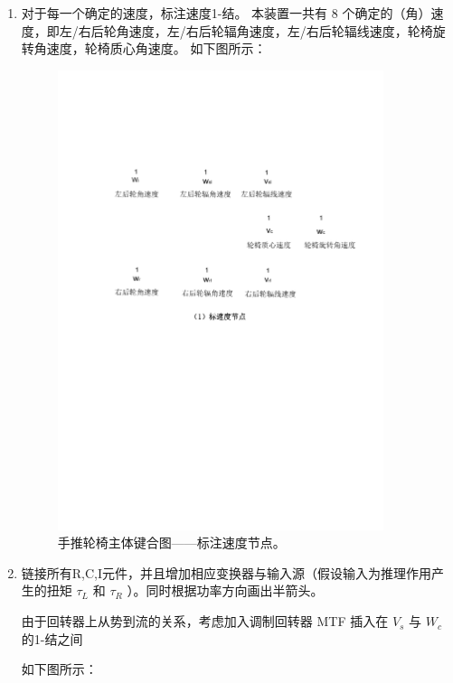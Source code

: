 	\begin{enumerate}
		
		\item 对于每一个确定的速度，标注速度1-结。
		本装置一共有 8 个确定的（角）速度，即左/右后轮角速度，左/右后轮辐角速度，左/右后轮辐线速度，轮椅旋转角速度，轮椅质心角速度。
		如下图所示：
		
		\begin{figure}[!h]
			\centering
			\includegraphics[width=0.9\textwidth]{fig/3_1_bond.pdf}
			\caption{手推轮椅主体键合图——标注速度节点。}\label{fig:3_1_bond}
		\end{figure}
			
		\item 链接所有R,C,I元件，并且增加相应变换器与输入源（假设输入为推理作用产生的扭矩 $ \tau_L $ 和 $ \tau_R $ ）。同时根据功率方向画出半箭头。
		
		由于回转器上从势到流的关系，考虑加入调制回转器 MTF 插入在 $ V_s $ 与 $ W_c $ 的1-结之间
		
		如下图所示：
		

\end{enumerate}
